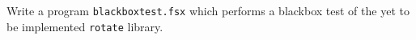 Write a program \lstinline{blackboxtest.fsx} which performs a blackbox test of the yet to be implemented \lstinline{rotate} library.
